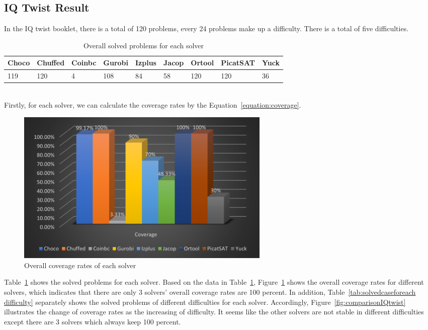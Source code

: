 \subsection{IQ Twist Result}
\label{sec:IQtwistresult}
In the IQ twist booklet, there is a total of 120 problems, every 24 problems make up a difficulty. There is a total of five difficulties.
\begin{table}[htbp]
\centering
\caption{Overall solved problems for each solver}
\label{tab:solvedcase}
\begin{tabular}{|l|l|l|l|l|l|l|l|l|}
\hline
Choco & Chuffed & Coinbc& Gurobi & Izplus&Jacop& Ortool& PicatSAT&Yuck \\
\hline
119   &120      & 4     & 108    &84     &58   &120    &120      &36\\
\hline
\end{tabular}
\end{table}
\\Firstly, for each solver, we can calculate the coverage rates by the Equation~\ref{equation:coverage}.
\begin{figure}[H]
     \centering
    \includegraphics[width=0.6\textwidth]{figs/coverage.png}
    \caption{Overall coverage rates of each solver}
    \label{eva2}
\end{figure}
Table~\ref{tab:solvedcase} shows the solved problems for each solver. Based on the data in Table~\ref{tab:solvedcase},
Figure~\ref{eva2} shows the overall coverage rates for different solvers, which indicates that there are only 3 solvers' overall coverage rates are 100 percent.
In addition, Table~\ref{tab:solvedcaseforeach difficulty} separately shows the solved problems of different difficulties for each solver. Accordingly, Figure~\ref{fig:comparisonIQtwist} illustrates the change of coverage rates as the increasing of difficulty. It seems like the other solvers are not stable in different difficulties except there are 3 solvers which always keep 100 percent.
